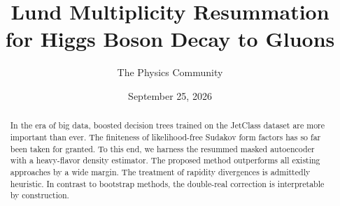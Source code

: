 \documentclass[11pt]{article}
\title{Lund Multiplicity Resummation for Higgs Boson Decay to Gluons}
\author{The Physics Community}
\date{September 25, 2026}
\numberwithin{equation}{section}
\theoremstyle{definition}
\theoremstyle{remark}
\begin{document}
\maketitle
\begin{abstract}
In the era of big data, boosted decision trees trained on the JetClass
dataset are more important than ever. The finiteness of likelihood-free
Sudakov form factors has so far been taken for granted. To this end, we
harness the resummed masked autoencoder with a heavy-flavor density
estimator. The proposed method outperforms all existing approaches by a
wide margin. The treatment of rapidity divergences is admittedly
heuristic. In contrast to bootstrap methods, the double-real correction
is interpretable by construction.
\end{abstract}
\tableofcontents





\nocite{*}


\end{document}
